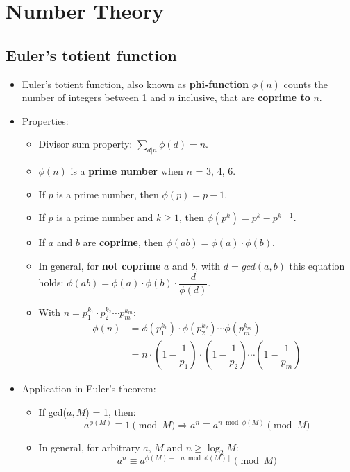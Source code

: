 \section{Number Theory}

\subsection{Euler's totient function}
\begin{itemize}
  \item Euler's totient function, also known as \textbf{phi-function} $\phi(n)$
  counts the number of integers between 1 and $n$ inclusive, that are
  \textbf{coprime to} $n$.
  \item Properties:
  \begin{itemize}
    \item Divisor sum property: $\sum\limits_{d | n} \phi(d) = n$.
    \item $\phi(n)$ is a \textbf{prime number} when $n$ = 3, 4, 6.
    \item If $p$ is a prime number, then $\phi(p) = p - 1$.
    \item If $p$ is a prime number and $k \geq 1$, then $\phi(p^k) = p^k - p^{k - 1}$.
    \item If $a$ and $b$ are \textbf{coprime}, then $\phi(ab) = \phi(a) \cdot \phi(b)$.
    \item In general, for \textbf{not coprime} $a$ and $b$, with $d = gcd(a, b)$ this equation holds:
    $\phi(ab) = \phi(a) \cdot \phi(b) \cdot \dfrac{d}{\phi(d)}$.
    \item With $n = p_1^{k_1} \cdot p_2^{k_2} \cdots p_m^{k_m}$:
    \begin{align*}
      \phi(n) &= \phi(p_1^{k_1}) \cdot \phi(p_2^{k_2}) \cdots \phi(p_m^{k_m}) \\
      &= n \cdot \left(1 - \dfrac{1}{p_1}\right) \cdot \left(1 - \dfrac{1}{p_2}\right) \cdots \left(1 - \dfrac{1}{p_m}\right)
    \end{align*}
  \end{itemize}
  \item Application in Euler's theorem:
  \begin{itemize}
    \item If gcd($a, M$) = 1, then:
    \[ a^{\phi(M)} \equiv 1 \pmod M \Rightarrow a^{n} \equiv a^{n \bmod \phi(M)} \pmod M \]
    \item In general, for arbitrary $a$, $M$ and $n \geq \log_2{M}$:
    \[ a^{n} \equiv a^{\phi(M) + [n \bmod \phi(M)]} \pmod M \]
  \end{itemize}
\end{itemize}

